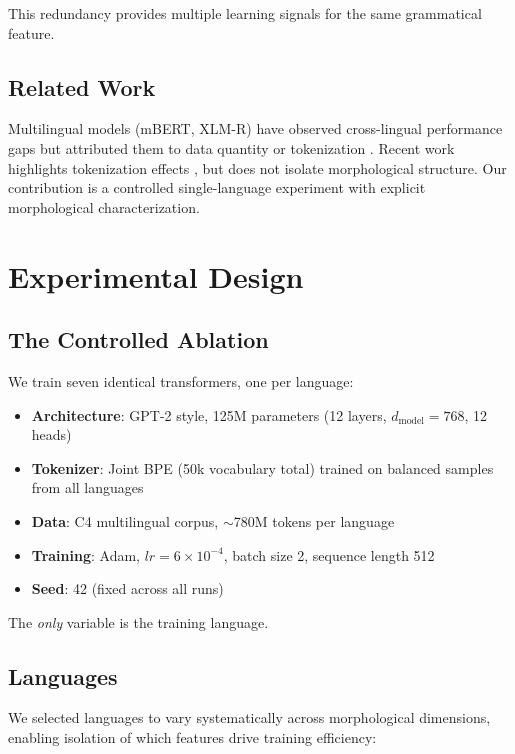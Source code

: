 \documentclass[11pt]{article}
\begin{document}
This redundancy provides multiple learning signals for the same grammatical feature.

\subsection{Related Work}

Multilingual models (mBERT, XLM-R) have observed cross-lingual performance gaps but attributed them to data quantity or tokenization \citep{conneau2020unsupervised}. Recent work highlights tokenization effects \citep{rust2021good}, but does not isolate morphological structure. Our contribution is a controlled single-language experiment with explicit morphological characterization.

\section{Experimental Design}

\subsection{The Controlled Ablation}

We train seven identical transformers, one per language:

\begin{itemize}
    \item \textbf{Architecture}: GPT-2 style, 125M parameters (12 layers, $d_{\text{model}}=768$, 12 heads)
    \item \textbf{Tokenizer}: Joint BPE (50k vocabulary total) trained on balanced samples from all languages
    \item \textbf{Data}: C4 multilingual corpus, $\sim$780M tokens per language
    \item \textbf{Training}: Adam, $lr=6\times10^{-4}$, batch size 2, sequence length 512
    \item \textbf{Seed}: 42 (fixed across all runs)
\end{itemize}

The \textit{only} variable is the training language.

\subsection{Languages}

We selected languages to vary systematically across morphological dimensions, enabling isolation of which features drive training efficiency:
\end{document}
